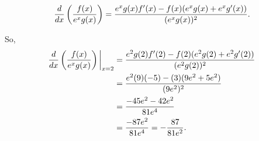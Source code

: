 \documentclass[handout,nooutcomes]{ximera}
\begin{document}
\begin{problem}
\begin{enumerate}
	 
		\begin{freeResponse}
		$$\frac{d}{dx} \left( \frac{f(x)}{e^x g(x)} \right)
		= \frac{e^x g(x) f'(x) - f(x)(e^x g(x) + e^x g'(x))}{(e^x g(x))^2}.$$
		
		So, 
		\begin{align*}
		\frac{d}{dx}\left(\frac{f(x)}{e^x g(x)}\right) \bigg|_{x=2}
		&= \frac{e^2 g(2) f'(2) - f(2)(e^2 g(2) + e^2 g'(2))}{(e^2 g(2))^2}  \\
		&= \frac{e^2 (9)(-5) - (3)(9e^2 + 5e^2)}{(9e^2)^2}  \\
		&= \frac{-45e^2 -42e^2}{81e^4}  \\
		&= \frac{-87e^2}{81e^4} = - \frac{87}{81e^2}.
		\end{align*}
		\end{freeResponse}
		
		
		
	\end{enumerate}
		
\end{problem}







	
	
	
	
	
	
	
	
	

	










								
				
				
	
\end{document}
